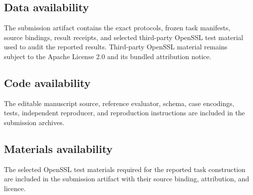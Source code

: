 \documentclass[pdflatex,sn-mathphys-num]{sn-jnl}
\begin{document}
\subsection{Data availability}\label{data-availability}

The submission artifact contains the exact protocols, frozen task manifests, source bindings, result receipts, and selected third-party OpenSSL test material used to audit the reported results. Third-party OpenSSL material remains subject to the Apache License 2.0 and its bundled attribution notice.

\subsection{Code availability}\label{code-availability}

The editable manuscript source, reference evaluator, schema, case encodings, tests, independent reproducer, and reproduction instructions are included in the submission archives.

\subsection{Materials availability}\label{materials-availability}

The selected OpenSSL test materials required for the reported task construction are included in the submission artifact with their source binding, attribution, and licence.


\end{document}
